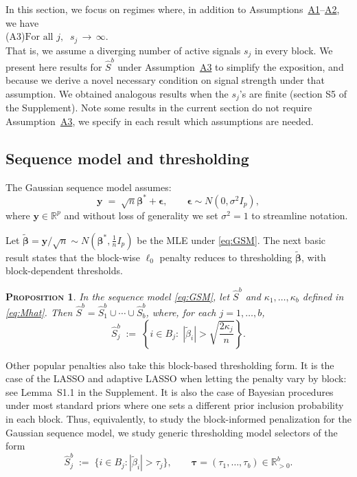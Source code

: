 \documentclass[bj,authoryear]{imsart}
\theoremstyle{plain}
\newtheorem{prop}[thm]{\textsc{Proposition}}
\newcommand{\R}{\mathbb{R}}
\newcommand{\bs}{\boldsymbol}
\begin{document}
In this section, we focus on regimes where, in addition to Assumptions~\hyperlink{lab:A1}{A1}--\hyperlink{lab:A2}{A2}, we have\\[5pt]
\hypertarget{lab:A3}{(A3)}\quad $\text{For all } j, \;\; s_j \,\to \, \infty$.\\[5pt]
That is, we assume a diverging number of active signals $s_j$ in every block. %
We present here results for $\hat S^b$ under Assumption~\hyperlink{lab:A3}{A3} to simplify the exposition, and because we derive a novel necessary condition on signal strength under that assumption. We obtained analogous results when the $s_j$'s are finite (section S5 of the Supplement). Note some results in the current section do not require Assumption~\hyperlink{lab:A3}{A3}, we specify in each result which assumptions are needed. 

\subsection{Sequence model and thresholding}\label{sec:GSMgen}

The Gaussian sequence model assumes:
\begin{equation}\label{eq:GSM}
	\bs y \;=\; \sqrt{n} \bs \beta^* + \bs\epsilon,\qquad \bs \epsilon \sim N(0,\sigma^2 I_p),
\end{equation}
where $\bs y \in \mathbb{R}^p$ and without loss of generality we set $\sigma^2=1$ to streamline notation. 

Let $\tilde{\bs \beta}=\bs y/\sqrt{n} \sim N(\bs \beta^*,\tfrac{1}{n}I_p)$ be the MLE under \eqref{eq:GSM}. The next basic result states that %
the block-wise $\ell_0$ penalty reduces to thresholding $\tilde{\bs \beta}$, %
with block-dependent thresholds.
\begin{prop}\label{prop:isthresh}
	In the sequence model \eqref{eq:GSM}, let $\hat{S}^b$ and $\kappa_1,\ldots,\kappa_b$ defined in \eqref{eq:Mhat}. Then $\hat S^b=\hat S^b_1\cup \cdots \cup \hat S^b_b$, where, for each $j=1,\ldots,b$,
	$$
	\hat S_j^b\;:=\;\left\{i\in B_j:\; |\tilde{\beta}_i|> \sqrt{\frac{2\kappa_j}{n}}\right\}.
	$$ 
\end{prop}
Other popular penalties
also take this block-based thresholding form. It is the case of the LASSO and adaptive LASSO when letting the penalty vary by block: see Lemma~S1.1 %
in the Supplement. %
It is also the case of Bayesian procedures under most standard priors \citep{davidomiros} where one sets a different prior inclusion probability in each block. Thus, equivalently, to study the block-informed penalization for the Gaussian sequence model, we study generic thresholding model selectors of the form
\begin{equation}\label{eq:thresholdS}
\hat S_j^{b}\;:=\;\{i\in B_j: |\tilde{\beta}_i|>\tau_j\}, \qquad\bs \tau=(\tau_1,\ldots,\tau_b)\in \R^b_{>0}.	
\end{equation}
\end{document}
